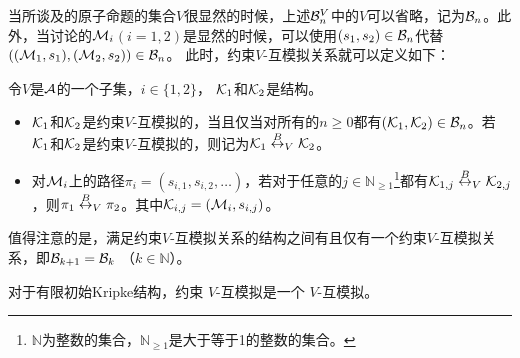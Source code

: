 当所谈及的原子命题的集合$V$很显然的时候，上述${\cal B}_n^V$中的$V$可以省略，记为${\cal B}_n$。此外，当讨论的${\cal M}_i$$(i=1,2)$是显然的时候，可以使用$(s_1,s_2) \in {\cal B}_n$代替$(({\cal M}_1,s_1),({\cal M}_2,s_2)) \in {\cal B}_n$。
此时，约束$V$-互模拟关系就可以定义如下：
\begin{definition}[约束$V$-互模拟]\label{def:V-bisimulation}
	令$V$是${\cal A}$的一个子集，$i\in \{1,2\}$， ${\cal K}_1$和${\cal K}_2$是结构。
	\begin{itemize}
		\item ${\cal K}_1$和${\cal K}_2$是约束$V$-互模拟的，当且仅当对所有的$n \ge 0$都有$({\cal K}_1, {\cal K}_2)\in {\cal B}_n$。若${\cal K}_1$和${\cal K}_2$是约束$V$-互模拟的，则记为${\cal K}_1 \overset{B}{\leftrightarrow}_V {\cal K}_2$。
		\item 对${\cal M}_i$上的路径$\pi_i=(s_{i,1},s_{i,2},\dots)$，若对于任意的$j\in \mathbb{N}_{\ge 1}$\footnote{$\mathbb{N}$为整数的集合，$\mathbb{N}_{\ge 1}$是大于等于1的整数的集合。}都有${\cal K}_{1,j} \overset{B}{\leftrightarrow}_V {\cal K}_{2,j}$，则$\pi_1 \overset{B}{\leftrightarrow}_V \pi_2$。其中${\cal K}_{i, j}=({\cal M}_i, s_{i,j})$。
	\end{itemize}
\end{definition}

值得注意的是，满足约束$V$-互模拟关系的结构之间有且仅有一个约束$V$-互模拟关系，即${\cal B}_{k+1} = {\cal B}_k$ （$k \in \mathbb{N}$）。


\begin{lemma} \label{lem:HbBis}
	对于有限初始Kripke结构，约束 $V$-互模拟是一个 $V$-互模拟。
\end{lemma}

